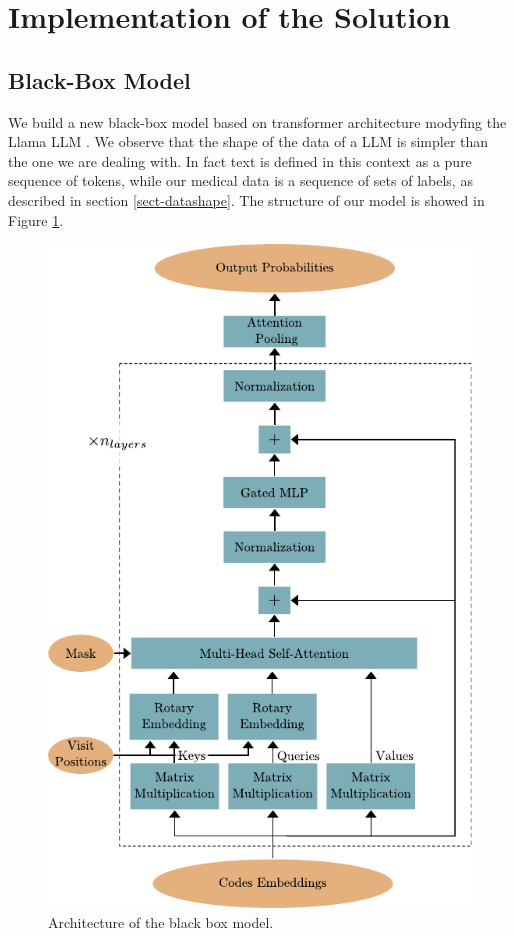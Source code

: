 \documentclass[]{marticle}
\begin{document}
\section{Implementation of the Solution}

\subsection{Black-Box Model} \label{sect-kelso}

We build a new black-box model based on transformer architecture modyfing the Llama LLM . We observe that the shape of the data of a LLM is simpler than the one we
are dealing with. In fact text is defined in this context as a pure sequence of tokens, while our
medical data is a sequence of sets of labels, as described in section \ref{sect-datashape}. The
structure of our model is showed in Figure \ref{fig:kelso-architecture}.

\begin{figure}[!ht] 
\center
\includegraphics{kelso_architecture.pdf}
\caption{Architecture of the black box model.} 
\label{fig:kelso-architecture} 
\end{figure}
\end{document}
